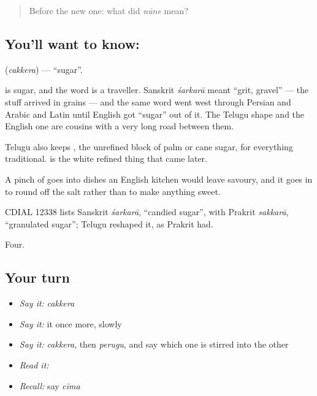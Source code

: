 \label{lesson:TE-C61-sugar}



\begin{quote}
Before the new one: what did \emph{nūne} mean?
\end{quote}

\subsection*{You'll want to know: }
\textbf{} (\emph{cakkera}) — \textquotedblleft{}sugar\textquotedblright{}.

 is sugar, and the word is a traveller. Sanskrit \emph{śarkarā} meant \textquotedblleft{}grit, gravel\textquotedblright{} — the stuff arrived in grains — and the same word went west through Persian and Arabic and Latin until English got \textquotedblleft{}sugar\textquotedblright{} out of it. The Telugu shape and the English one are cousins with a very long road between them.

Telugu also keeps , the unrefined block of palm or cane sugar, for everything traditional.  is the white refined thing that came later.

A pinch of  goes into dishes an English kitchen would leave savoury, and it goes in to round off the salt rather than to make anything sweet.

CDIAL 12338 lists Sanskrit \emph{śarkarā}, \textquotedblleft{}candied sugar\textquotedblright{}, with Prakrit \emph{sakkarā}, \textquotedblleft{}granulated sugar\textquotedblright{}; Telugu reshaped it, as Prakrit had.

\begin{grammarlens}[title={What you've built}]
Four.
\end{grammarlens}

\subsection*{Your turn}
\begin{itemize}
\raggedright
  \item \emph{Say it:} \emph{cakkera}
  \item \emph{Say it:} it once more, slowly
  \item \emph{Say it:} \emph{cakkera}, then \emph{perugu}, and say which one is stirred into the other
  \item \emph{Read it:} \textbf{}
  \item \emph{Recall:} say \emph{cīma}
\end{itemize}

